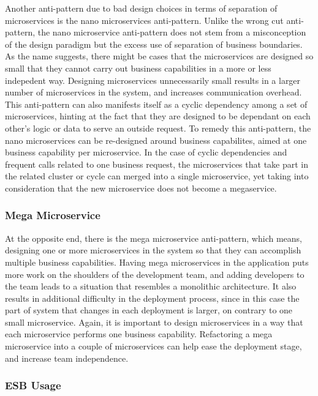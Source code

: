\documentclass{Configuration_Files/PoliMi3i_thesis}
\begin{document}
Another anti-pattern due to bad design choices in terms of separation of microservices is the nano microservices anti-pattern.
Unlike the wrong cut anti-pattern, the nano microservice anti-pattern does not stem from a misconception of the design paradigm but the excess use of separation of business boundaries.
As the name suggests, there might be cases that the microservices are designed so small that they cannot carry out business capabilities in a more or less indepedent way.
Designing microservices unnecessarily small results in a larger number of microservices in the system, and increases communication overhead.
This anti-pattern can also manifests itself as a cyclic dependency among a set of microservices, hinting at the fact that they are designed to be dependant on each other's logic or data to serve an outside request.
To remedy this anti-pattern, the nano microservices can be re-designed around business capabilites, aimed at one business capability per microservice.
In the case of cyclic dependencies and frequent calls related to one business request, the microservices that take part in the related cluster or cycle can merged into a single microservice, yet taking into consideration that the new microservice does not become a megaservice.

\subsubsection{Mega Microservice}
\label{subsubsec:mega_microservice}

At the opposite end, there is the mega microservice anti-pattern, which means, designing one or more microservices in the system so that they can accomplish multiple business capabilities.
Having mega microservices in the application puts more work on the shoulders of the development team, and adding developers to the team leads to a situation that resembles a monolithic architecture.
It also results in additional difficulty in the deployment process, since in this case the part of system that changes in each deployment is larger, on contrary to one small microservice.
Again, it is important to design microservices in a way that each microservice performs one business capability.
Refactoring a mega microservice into a couple of microservices can help ease the deployment stage, and increase team independence.

\subsubsection{ESB Usage}
\label{subsubsec:esb_usage}
\end{document}
